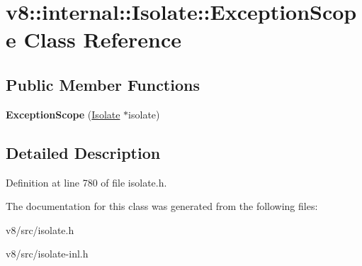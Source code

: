 \hypertarget{classv8_1_1internal_1_1Isolate_1_1ExceptionScope}{}\section{v8\+:\+:internal\+:\+:Isolate\+:\+:Exception\+Scope Class Reference}
\label{classv8_1_1internal_1_1Isolate_1_1ExceptionScope}
\subsection*{Public Member Functions}
\begin{DoxyCompactItemize}
\item 
\mbox{\label{classv8_1_1internal_1_1Isolate_1_1ExceptionScope_a513f450377f5c44b9aa2c271ad3e4b3a}} 
{\bfseries Exception\+Scope} (\mbox{\hyperlink{classv8_1_1internal_1_1Isolate}{Isolate}} $\ast$isolate)
\end{DoxyCompactItemize}


\subsection{Detailed Description}


Definition at line 780 of file isolate.\+h.



The documentation for this class was generated from the following files\+:\begin{DoxyCompactItemize}
\item 
v8/src/isolate.\+h\item 
v8/src/isolate-\/inl.\+h\end{DoxyCompactItemize}
